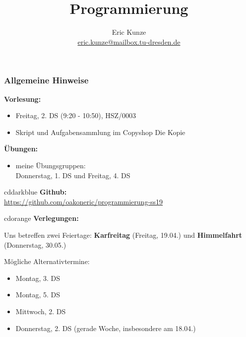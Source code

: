 \documentclass[aspectratio=1610,onlymath, ngerman, handout]{beamer}
\title{Programmierung}%
\subtitle{Übung #1: #2}%
\author{Eric Kunze \\ \url{eric.kunze@mailbox.tu-dresden.de} }%
\date{#3}%
\renewcommand{\emph}[1]{\textbf{#1}}
\begin{document}
    \maketitle
    
    \begin{frame}\frametitle{Allgemeine Hinweise}
        \begin{minipage}{\dimexpr0.5\linewidth-\fboxrule-\fboxsep}
            \emph{Vorlesung:}
            \begin{itemize}
                \item Freitag, 2. DS (9:20 - 10:50), HSZ/0003
                \item Skript und Aufgabensammlung im Copyshop \glqq Die Kopie\grqq
            \end{itemize}
            
            \medskip
            
            \emph{Übungen:}
            \begin{itemize}
                \item meine Übungsgruppen: \\
                Donnerstag, 1. DS und Freitag, 4. DS
            \end{itemize}
           \end{minipage}
           \pause
           \begin{minipage}{\dimexpr0.5\linewidth-\fboxrule-\fboxsep}
            \begin{doodle}{cddarkblue}
                \emph{Github:} \\
                \url{https://github.com/oakoneric/programmierung-ss19}
            \end{doodle}
        \end{minipage}
        \pause
        \begin{doodle}{cdorange}
            {\normalsize \bfseries Verlegungen:} \par 
            \smallskip
            Uns betreffen zwei Feiertage: \quad
            \emph{Karfreitag} (Freitag, 19.04.) und \emph{Himmelfahrt} (Donnerstag, 30.05.) \par \smallskip
            
            Mögliche Alternativtermine:
            \begin{itemize}
                \item Montag, 3. DS
                \item Montag, 5. DS
                \item Mittwoch, 2. DS
                \item Donnerstag, 2. DS (gerade Woche, insbesondere am 18.04.)
            \end{itemize}
        \end{doodle}  
    \end{frame}
\end{document}
